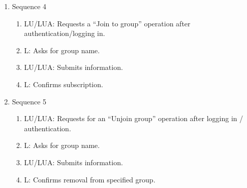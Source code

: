 \documentclass[11pt]{report} %
\begin{document}
\begin{enumerate}
\begin{enumerate}
			\item
				Sequence 4
					\begin{enumerate}
						\item
							LU/LUA: Requests a “Join to group” operation after authentication/logging in.
						\item
							L: Asks for group name.
						\item
							LU/LUA: Submits information.
						\item
							L: Confirms subscription.
					\end{enumerate}

			\item
				Sequence 5
					\begin{enumerate}
						\item
							LU/LUA: Requests for an “Unjoin group” operation after logging in / authentication.
						\item
							L: Asks for group name.
						\item
							LU/LUA: Submits information.
						\item
							L: Confirms removal from specified group.
					\end{enumerate}

		\end{enumerate}
\end{enumerate}
\end{document}

